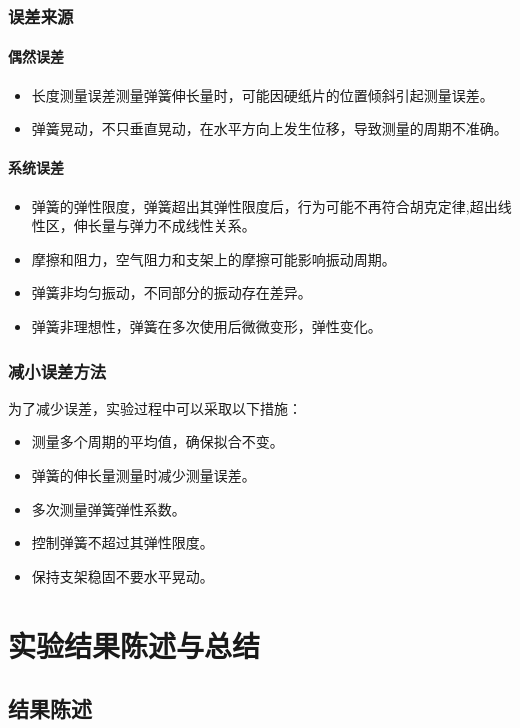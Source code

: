 \documentclass[a4paper,zihao=5,UTF8,fontset=fandol]{../phyreport}
\begin{document}
\subsubsection{误差来源}
\paragraph{偶然误差}
\begin{itemize}
	\item 长度测量误差测量弹簧伸长量时，可能因硬纸片的位置倾斜引起测量误差。
	\item 弹簧晃动，不只垂直晃动，在水平方向上发生位移，导致测量的周期不准确。
\end{itemize}

\paragraph{系统误差}
\begin{itemize}
	\item 弹簧的弹性限度，弹簧超出其弹性限度后，行为可能不再符合胡克定律,超出线性区，伸长量与弹力不成线性关系。
	\item 摩擦和阻力，空气阻力和支架上的摩擦可能影响振动周期。
	\item 弹簧非均匀振动，不同部分的振动存在差异。
	\item 弹簧非理想性，弹簧在多次使用后微微变形，弹性变化。
\end{itemize}

\subsubsection{减小误差方法}
为了减少误差，实验过程中可以采取以下措施：
\begin{itemize}
	\item 测量多个周期的平均值，确保拟合不变。
	\item 弹簧的伸长量测量时减少测量误差。
	\item 多次测量弹簧弹性系数。
	\item 控制弹簧不超过其弹性限度。
	\item 保持支架稳固不要水平晃动。
\end{itemize}

\section{实验结果陈述与总结}
\subsection{结果陈述}
\end{document}
